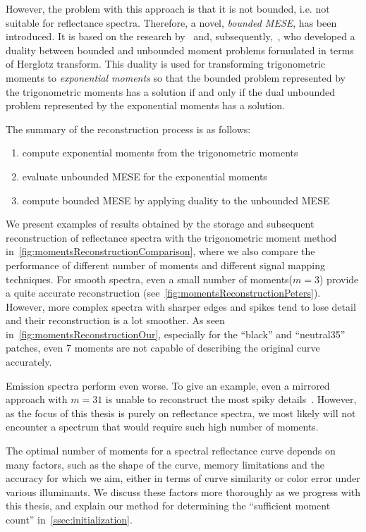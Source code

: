 However, the problem with this approach is that it is not bounded, i.e. not suitable for reflectance spectra. Therefore, a novel, \emph{bounded MESE}, has been introduced. It is based on the research by~\citet{dualityBoundedUnboundedMarkoff} and, subsequently,~\citet{dualityBoundedUnboundedKrein}, who developed a duality between bounded and unbounded moment problems formulated in terms of Herglotz transform. This duality is used for transforming trigonometric moments to \emph{exponential moments} so that the bounded problem represented by the trigonometric moments has a solution if and only if the dual unbounded problem represented by the exponential moments has a solution.

The summary of the reconstruction process is as follows:
\begin{enumerate}
	\item compute exponential moments from the trigonometric moments
	\item evaluate unbounded MESE for the exponential moments
	\item compute bounded MESE by applying duality to the unbounded MESE
\end{enumerate}

We present examples of results obtained by the storage and subsequent reconstruction of reflectance spectra with the trigonometric moment method in~\cref{fig:momentsReconstructionComparison}, where we also compare the performance of different number of moments and different signal mapping techniques. For smooth spectra, even a small number of moments($m=3$) provide a quite accurate reconstruction (see~\cref{fig:momentsReconstructionPeters}). However, more complex spectra with sharper edges and spikes tend to lose detail and their reconstruction is a lot smoother. As seen in~\cref{fig:momentsReconstructionOur}, especially for the ``black'' and ``neutral35'' patches, even 7 moments are not capable of describing the original curve accurately.

Emission spectra perform even worse. To give an example, even a mirrored approach with $m=31$ is unable to reconstruct the most spiky details~\cite{trigonometricMomentsPaper}. However, as the focus of this thesis is purely on reflectance spectra, we most likely will not encounter a spectrum that would require such high number of moments.

The optimal number of moments for a spectral reflectance curve depends on many factors, such as the shape of the curve, memory limitations and the accuracy for which we aim, either in terms of curve similarity or color error under various illuminants. We discuss these factors more thoroughly as we progress with this thesis, and explain our method for determining the ``sufficient moment count'' in~\cref{ssec:initialization}.

